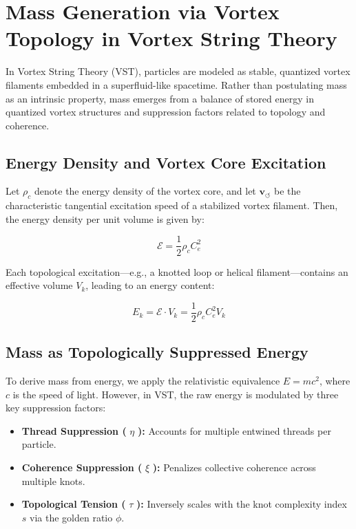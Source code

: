 \documentclass[11pt]{article}
\begin{document}
    \section{Mass Generation via Vortex Topology in Vortex String Theory}

    In Vortex String Theory (VST), particles are modeled as stable, quantized vortex filaments embedded in a superfluid-like spacetime. Rather than postulating mass as an intrinsic property, mass emerges from a balance of stored energy in quantized vortex structures and suppression factors related to topology and coherence.

    \subsection{Energy Density and Vortex Core Excitation}

    Let \( \rho_c \) denote the energy density of the vortex core, and let \( \mathbf{v}_{\scriptscriptstyle\boldsymbol{\circlearrowleft}} \) be the characteristic tangential excitation speed of a stabilized vortex filament. Then, the energy density per unit volume is given by:

    \[
        \mathcal{E} = \frac{1}{2} \rho_c C_e^2
    \]

    Each topological excitation—e.g., a knotted loop or helical filament—contains an effective volume \( V_k \), leading to an energy content:

    \[
        E_k = \mathcal{E} \cdot V_k = \frac{1}{2} \rho_c C_e^2 V_k
    \]

    \subsection{Mass as Topologically Suppressed Energy}

    To derive mass from energy, we apply the relativistic equivalence \( E = mc^2 \), where \( c \) is the speed of light. However, in VST, the raw energy is modulated by three key suppression factors:

    \begin{itemize}
        \item \textbf{Thread Suppression (} \( \eta \) \textbf{):} Accounts for multiple entwined threads per particle.
        \item \textbf{Coherence Suppression (} \( \xi \) \textbf{):} Penalizes collective coherence across multiple knots.
        \item \textbf{Topological Tension (} \( \tau \) \textbf{):} Inversely scales with the knot complexity index \( s \) via the golden ratio \( \phi \).
    \end{itemize}
\end{document}
